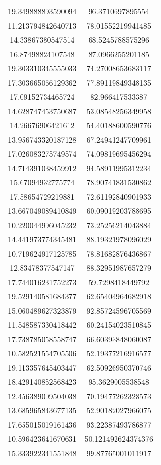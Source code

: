 \begin{table}
\begin{tabular}{cc}
19.349888893590094 & 96.3710697895554 \\
11.213794842640713 & 78.01552219941485 \\
14.33867380547514 & 68.5245788575296 \\
16.87498824107548 & 87.0966255201185 \\
19.303310345555033 & 74.27008653683117 \\
17.303665066129362 & 77.89119849348135 \\
17.09152734465724 & 82.966417533387 \\
14.628747453750687 & 53.08548256349958 \\
14.26676906421612 & 54.40188600590776 \\
13.956743320187128 & 67.24941247709961 \\
17.026083275749574 & 74.09819695456294 \\
14.714391038459912 & 94.58911995312234 \\
15.67094932775774 & 78.90741831530862 \\
17.58654729219881 & 72.61192840901933 \\
13.667049089410849 & 60.09019203788695 \\
10.220044996045232 & 73.25256214043884 \\
14.441973774345481 & 88.19321978096029 \\
10.719624917125785 & 78.81682876436867 \\
12.83478377547147 & 88.32951987657279 \\
17.744016231752273 & 59.7298418449792 \\
19.529140581684377 & 62.65404964682918 \\
15.060489627323879 & 92.85724596705569 \\
11.548587330418442 & 60.24154023510845 \\
17.738785058558747 & 66.60393848060087 \\
10.582521554705506 & 52.19377216916577 \\
19.113357645403447 & 62.50926950370746 \\
18.429140852568423 & 95.3629005538548 \\
12.456389009504038 & 70.19477262328573 \\
13.685965843677135 & 52.90182027966075 \\
17.655015019161436 & 93.22387493786877 \\
10.596423641670631 & 50.121492624374376 \\
15.333922341551848 & 99.87765001011917 \\

\end{tabular}
\end{table}
